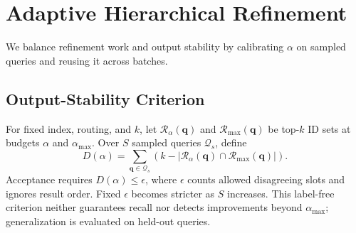 



\section{Adaptive Hierarchical Refinement}
\label{sec:adaptive_refinement}
We balance refinement work and output stability by calibrating $\alpha$ on sampled queries and reusing it across batches.

\subsection{Output-Stability Criterion}
\label{sec:output_stability}
For fixed index, routing, and $k$, let $\mathcal{R}_{\alpha}(\mathbf{q})$ and $\mathcal{R}_{\max}(\mathbf{q})$ be top-$k$ ID sets at budgets $\alpha$ and $\alpha_{\max}$. Over $S$ sampled queries $\mathcal{Q}_s$, define
\begin{equation}
D(\alpha)=\sum_{\mathbf{q}\in\mathcal{Q}_s}\left(k-|\mathcal{R}_{\alpha}(\mathbf{q})\cap\mathcal{R}_{\max}(\mathbf{q})|\right).
\label{eq:output_disagreement}
\end{equation}
Acceptance requires $D(\alpha)\leq\epsilon$, where $\epsilon$ counts allowed disagreeing slots and ignores result order. Fixed $\epsilon$ becomes stricter as $S$ increases. This label-free criterion neither guarantees recall nor detects improvements beyond $\alpha_{\max}$; generalization is evaluated on held-out queries.

